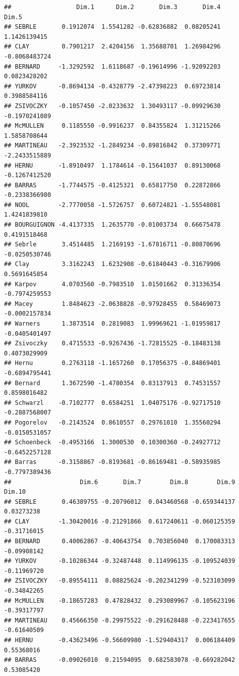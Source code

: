 \documentclass[
]{book}
\begin{document}
\begin{verbatim}
##                  Dim.1      Dim.2       Dim.3       Dim.4         Dim.5
## SEBRLE       0.1912074  1.5541282 -0.62836882  0.08205241  1.1426139415
## CLAY         0.7901217  2.4204156  1.35688701  1.26984296 -0.8068483724
## BERNARD     -1.3292592  1.6118687 -0.19614996 -1.92092203  0.0823428202
## YURKOV      -0.8694134 -0.4328779 -2.47398223  0.69723814  0.3988584116
## ZSIVOCZKY   -0.1057450 -2.0233632  1.30493117 -0.09929630 -0.1970241089
## McMULLEN     0.1185550 -0.9916237  0.84355824  1.31215266  1.5858708644
## MARTINEAU   -2.3923532 -1.2849234 -0.89816842  0.37309771 -2.2433515889
## HERNU       -1.8910497  1.1784614 -0.15641037  0.89130068 -0.1267412520
## BARRAS      -1.7744575 -0.4125321  0.65817750  0.22872866 -0.2338366980
## NOOL        -2.7770058 -1.5726757  0.60724821 -1.55548081  1.4241839810
## BOURGUIGNON -4.4137335  1.2635770 -0.01003734  0.66675478  0.4191518468
## Sebrle       3.4514485  1.2169193 -1.67816711 -0.80870696 -0.0250530746
## Clay         3.3162243  1.6232908 -0.61840443 -0.31679906  0.5691645854
## Karpov       4.0703560 -0.7983510  1.01501662  0.31336354 -0.7974259553
## Macey        1.8484623 -2.0638828 -0.97928455  0.58469073 -0.0002157834
## Warners      1.3873514  0.2819083  1.99969621 -1.01959817 -0.0405401497
## Zsivoczky    0.4715533 -0.9267436 -1.72815525 -0.18483138  0.4073029909
## Hernu        0.2763118 -1.1657260  0.17056375 -0.84869401 -0.6894795441
## Bernard      1.3672590 -1.4780354  0.83137913  0.74531557  0.8598016482
## Schwarzl    -0.7102777  0.6584251  1.04075176 -0.92717510 -0.2887568007
## Pogorelov   -0.2143524  0.8610557  0.29761010  1.35560294 -0.0150531057
## Schoenbeck  -0.4953166  1.3000530  0.10300360 -0.24927712 -0.6452257128
## Barras      -0.3158867 -0.8193681 -0.86169481 -0.58935985 -0.7797389436
##                   Dim.6       Dim.7        Dim.8        Dim.9      Dim.10
## SEBRLE       0.46389755 -0.20796012  0.043460568 -0.659344137  0.03273238
## CLAY        -1.30420016 -0.21291866  0.617240611 -0.060125359 -0.31716015
## BERNARD      0.40062867 -0.40643754  0.703856040  0.170083313 -0.09908142
## YURKOV      -0.10286344 -0.32487448  0.114996135 -0.109524039 -0.11969720
## ZSIVOCZKY   -0.89554111  0.08825624 -0.202341299 -0.523103099 -0.34842265
## McMULLEN    -0.18657283  0.47828432  0.293089967 -0.105623196 -0.39317797
## MARTINEAU    0.45666350 -0.29975522 -0.291628488 -0.223417655 -0.61640509
## HERNU       -0.43623496 -0.56609980 -1.529404317  0.006184409  0.55368016
## BARRAS      -0.09026010  0.21594095  0.682583078 -0.669282042  0.53085420

\end{verbatim}
\end{document}
